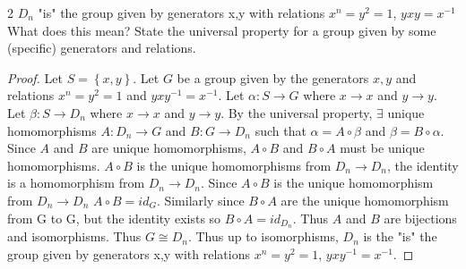 \documentclass{article}
\begin{document}
\begin{claim}{2}\label{Claim 2.}
    $D_n$ "is" the group given by generators x,y with relations $x^n=y^2=1$, $yxy= x^{-1}$ What does this mean? State the universal property for a group given by some (specific) generators and relations.
\end{claim}
\begin{proof}
    Let $S = \left\{ x, y \right\}$. Let $G$ be a group given by the generators $x, y$ and relations $x^n = y^2 = 1$ and $yxy^{-1} = x^{-1}$. Let $\alpha: S \to G$ where $x \to x$ and $y \to y$. Let $\beta: S \to D_n$ where $x \to x$ and $y \to y$. By the universal property, $\exists$ unique homomorphisms $A: D_n \to G$ and $B: G \to D_n$ such that $\alpha = A \circ \beta$ and $\beta = B \circ \alpha$. Since $A$ and $B$ are unique homomorphisms, $A \circ B$ and $B \circ A$ must be unique homomorphisms. $A \circ B $ is the unique homomorphisms from $D_n \to D_n$, the identity is a homomorphism from $D_n \to D_n$. Since $A \circ B$ is the unique homomorphism from $D_n \to D_n$ $A \circ B = id_G$. Similarly since $B \circ A$ are the unique homomorphism from G to G, but the identity exists so $B \circ A = id_{D_n}$. Thus $A$ and $B$ are bijections and isomorphisms. Thus $G \cong D_n$. Thus up to isomorphisms, $D_n$ is the "is" the group given by generators x,y with relations $x^n=y^2=1$, $yxy^{-1} = x^{-1}$.                            
\end{proof}
\end{document}
